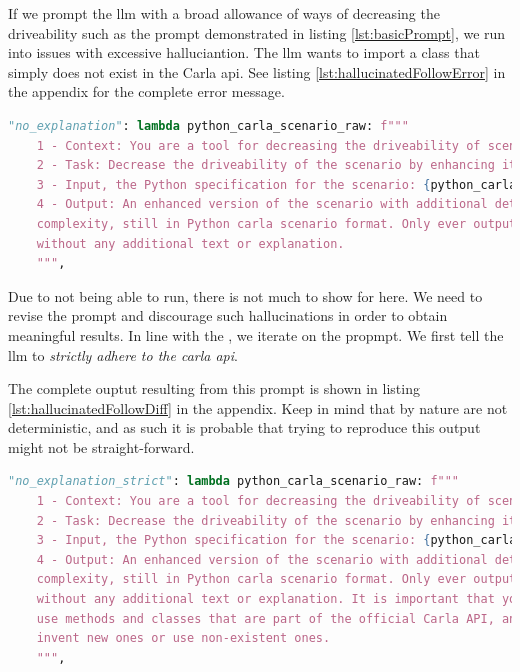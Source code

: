 If we prompt the \acrshort{llm} with a broad allowance of ways of decreasing the driveability such
as the prompt demonstrated in listing \ref{lst:basicPrompt}, we run into issues with excessive
halluciantion. The \acrshort{llm} wants to import a class that simply does not exist in the Carla
\acrshort{api}. See listing \ref{lst:hallucinatedFollowError} in the  appendix for the complete error message.


\begin{lstlisting}[language=python, label={lst:basicPrompt}, caption={The most basic prompt first used in the experiments. This leads to excessive halluciantion.}]
            "no_explanation": lambda python_carla_scenario_raw: f"""
    1 - Context: You are a tool for decreasing the driveability of scenarios in the driving simulator Carla.
    2 - Task: Decrease the driveability of the scenario by enhancing it with more details and complexity.
    3 - Input, the Python specification for the scenario: {python_carla_scenario_raw}
    4 - Output: An enhanced version of the scenario with additional details and
    complexity, still in Python carla scenario format. Only ever output the code,
    without any additional text or explanation.
    """,
\end{lstlisting}


Due to not being able to run, there is not much to show for here. We need to revise the prompt and
discourage such hallucinations in order to obtain meaningful results. In line with the
, we iterate on the propmpt. We first tell the \acrshort{llm} to
\emph{strictly adhere to the carla \acrshort{api}}.

The complete ouptut resulting from this prompt is shown in listing \ref{lst:hallucinatedFollowDiff}
in the appendix.
Keep in mind that  by nature are not deterministic, and as such it is probable
that trying to reproduce this output might not be straight-forward.

\begin{lstlisting}[language=python, label={lst:strictPrompt}, caption={A slightly more advanced prompt instructing the \acrshort{llm} to strictly adhere to the Carla \acrshort{api}.}]
        "no_explanation_strict": lambda python_carla_scenario_raw: f"""
    1 - Context: You are a tool for decreasing the driveability of scenarios in the driving simulator Carla.
    2 - Task: Decrease the driveability of the scenario by enhancing it with more details and complexity.
    3 - Input, the Python specification for the scenario: {python_carla_scenario_raw}
    4 - Output: An enhanced version of the scenario with additional details and
    complexity, still in Python carla scenario format. Only ever output the code,
    without any additional text or explanation. It is important that you only
    use methods and classes that are part of the official Carla API, and do not
    invent new ones or use non-existent ones.
    """,
\end{lstlisting}

